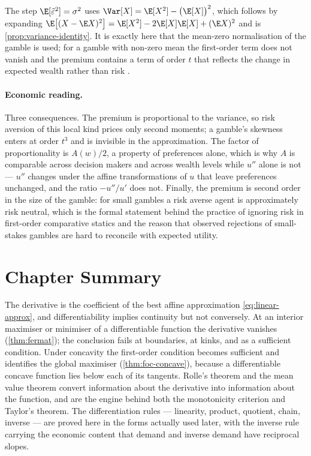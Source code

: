 \begin{remark}\label{rem:variance-identity}
	The step $\E[\tilde\varepsilon^2]=\sigma^2$ uses
	$\Var[X]=\E[X^2]-\bigl(\E[X]\bigr)^2$, which follows by expanding
	$\E\bigl[(X-\E X)^2\bigr]=\E[X^2]-2\E[X]\E[X]+(\E X)^2$ and is
	\autoref{prop:variance-identity}. It is exactly here that the mean-zero
	normalisation of the gamble is used; for a gamble with non-zero mean the
	first-order term does not vanish and the premium contains a term of order $t$
	that reflects the change in expected wealth rather than risk
	\autocite[slide 42]{fukuda2026calculus}.
\end{remark}

\paragraph{Economic reading.} Three consequences. The premium is proportional to
the variance, so risk aversion of this local kind prices only second moments; a
gamble's skewness enters at order $t^3$ and is invisible in the approximation.
The factor of proportionality is $A(w)/2$, a property of preferences alone,
which is why $A$ is comparable across decision makers and across wealth levels
while $u''$ alone is not --- $u''$ changes under the affine transformations of
$u$ that leave preferences unchanged, and the ratio $-u''/u'$ does not. Finally,
the premium is second order in the size of the gamble: for small gambles a risk
averse agent is approximately risk neutral, which is the formal statement behind
the practice of ignoring risk in first-order comparative statics and the reason
that observed rejections of small-stakes gambles are hard to reconcile with
expected utility.

\section{Chapter Summary}\label{sec:c1-summary}

The derivative is the coefficient of the best affine approximation
\eqref{eq:linear-approx}, and differentiability implies continuity but not
conversely. At an interior maximiser or minimiser of a differentiable function
the derivative vanishes (\autoref{thm:fermat}); the conclusion fails at
boundaries, at kinks, and as a sufficient condition. Under concavity the
first-order condition becomes sufficient and identifies the global maximiser
(\autoref{thm:foc-concave}), because a differentiable concave function lies
below each of its tangents. Rolle's theorem and the mean value theorem convert
information about the derivative into information about the function, and are the
engine behind both the monotonicity criterion and Taylor's theorem. The
differentiation rules --- linearity, product, quotient, chain, inverse ---
are proved here in the forms actually used later, with the inverse rule carrying
the economic content that demand and inverse demand have reciprocal slopes.

